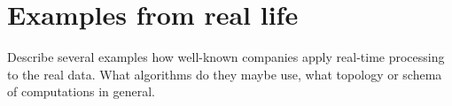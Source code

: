 \section{Examples from real life}

Describe several examples how well-known companies apply real-time processing to the real data.
What algorithms do they maybe use, what topology or schema of computations in general.